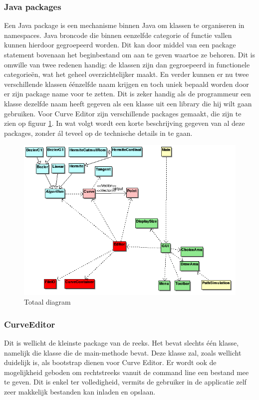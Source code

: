 \documentclass[a4paper,11pt,oneside, titlepage]{article}
\begin{document}
\subsubsection{Java packages}
Een Java package is een mechanisme binnen Java om klassen te organiseren in namespaces. 
Java broncode die binnen eenzelfde categorie of functie vallen kunnen hierdoor gegroepeerd 
worden. Dit kan door middel van een package statement bovenaan het beginbestand om aan te 
geven waartoe ze behoren. Dit is omwille van twee redenen handig: de klassen zijn dan gegroepeerd
in functionele categorie\"en, wat het geheel overzichtelijker maakt. En verder kunnen er nu twee 
verschillende klassen \'e\'enzelfde naam krijgen en toch uniek bepaald worden door er zijn
package name voor te zetten. Dit is zeker handig als de programmeur een klasse dezelfde naam
heeft gegeven als een klasse uit een library die hij wilt gaan gebruiken.\newline \newline
Voor Curve Editor zijn verschillende packages gemaakt, die zijn te zien op figuur \ref{iTot}.
In wat volgt wordt een korte beschrijving gegeven van al deze packages, zonder \'al teveel op de technische details in
te gaan.
\begin{figure}[htbp]
\centering
\includegraphics[scale=0.6]{./UML2/Total.png}
\caption{Totaal diagram}\label{iTot}
\end{figure}
\subsubsection{CurveEditor}
Dit is wellicht de kleinste package van de reeks. Het bevat slechts \'e\'en klasse, 
namelijk die klasse die de main-methode bevat. Deze klasse zal, zoals wellicht duidelijk is, als bootstrap dienen voor Curve Editor. 
Er wordt ook de mogelijkheid geboden om rechtstreeks vanuit
de command line een bestand mee te geven. Dit is enkel ter volledigheid, vermits de gebruiker in de applicatie zelf zeer makkelijk bestanden kan inladen en opslaan.
\end{document}
